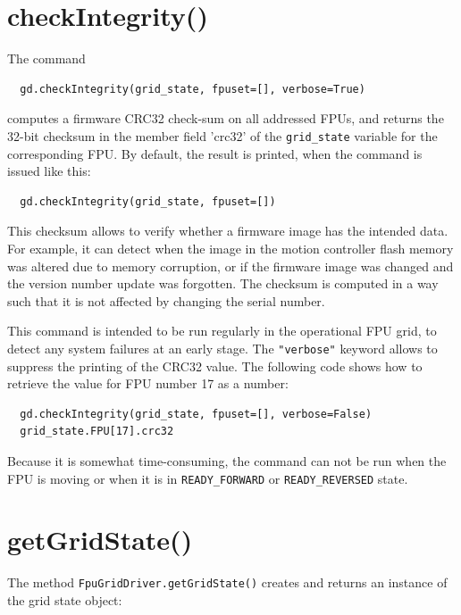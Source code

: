 \documentclass[fontsize=12,a4paper]{scrreprt}
\begin{document}
\section{checkIntegrity()}
%
%
%
%
%

The command
\begin{verbatim}
  gd.checkIntegrity(grid_state, fpuset=[], verbose=True)
\end{verbatim}
computes a firmware CRC32 check-sum on all addressed FPUs, and returns
the 32-bit checksum in the member field 'crc32' of the
\texttt{grid\_state} variable for the corresponding FPU. By default,
the result is printed, when the command is issued like this:

\begin{verbatim}
  gd.checkIntegrity(grid_state, fpuset=[])
\end{verbatim}

This checksum allows to verify whether a firmware image has the
intended data. For example, it can detect when the image in the motion
controller flash memory was altered due to memory corruption, or if
the firmware image was changed and the version number update was
forgotten. The checksum is computed in a way such that it is not
affected by changing the serial number.

This command is intended to be run regularly in the operational FPU
grid, to detect any system failures at an early stage.
The \texttt{"verbose"} keyword allows to suppress the printing
of the CRC32 value. The following code shows how to
retrieve the value for FPU number 17 as a number:

\begin{verbatim}
  gd.checkIntegrity(grid_state, fpuset=[], verbose=False)
  grid_state.FPU[17].crc32
\end{verbatim}


Because it is somewhat time-consuming, the command can not be run when
the FPU is moving or when it is in \texttt{READY\_FORWARD} or
\texttt{READY\_REVERSED} state.

\section{getGridState()}
The method \texttt{FpuGridDriver.getGridState()} creates and returns
an instance of the grid state object:
\end{document}
